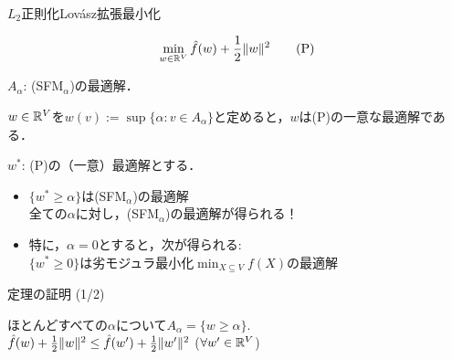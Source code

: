 \documentclass[14pt,aspectratio=169,xcolor=dvipsnames,table,onlytextwidth,dvipdfmx]{beamer}
\begin{document}
\begin{frame}{$L_2$正則化Lov\'asz拡張最小化}
    \small
    \begin{block}{}
        \[ \min_{w \in \mathbb{R}^V} \hat f(w) + \frac{1}{2} \lVert w\rVert^2 \qquad \text{(P)}\]
    \end{block}
    \vfill
    $A_\alpha$: (SFM$_\alpha$)の最適解．
    \begin{theorem}
        $w \in \mathbb{R}^V$を$w(v) := \sup\{\alpha : v \in A_\alpha\}$と定めると，$w$は(P)の一意な最適解である．
    \end{theorem}

    \pause
    \vfill
    $w^*$: (P)の（一意）最適解とする．
    \begin{itemize}
        \item $\{w^* \geq \alpha\}$は(SFM$_\alpha$)の最適解 \\
        \alert{全ての$\alpha$に対し，(SFM$_\alpha$)の最適解が得られる！}
        \item 特に，$\alpha = 0$とすると，次が得られる: \\ 
        $\{w^* \geq 0\}$は劣モジュラ最小化$\displaystyle \min_{X \subseteq V}f(X)$の最適解
    \end{itemize}
\end{frame}

\begin{frame}{定理の証明 (1/2)}
    \small

     ほとんどすべての$\alpha$について$A_\alpha = \{w \geq \alpha\}$. \\
    \vfill
     $\hat f(w) + \frac{1}{2} \lVert w\rVert^2 \leq \hat f(w') + \frac{1}{2} \lVert w'\rVert^2$ ($\forall w' \in \mathbb{R}^V$) 
\end{frame}
\end{document}
